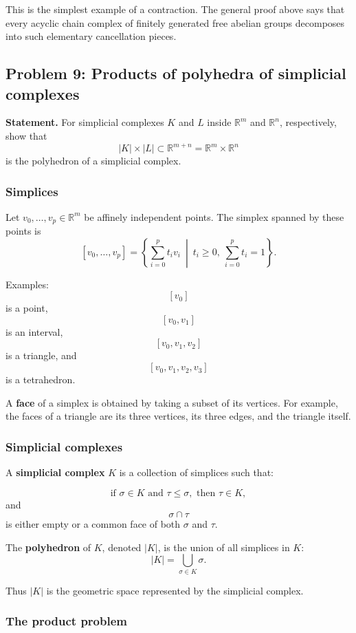 \documentclass[12pt,a4paper]{article}
\theoremstyle{notespace}
\begin{document}
This is the simplest example of a contraction. The general proof above says that every acyclic chain complex of finitely generated free abelian groups decomposes into such elementary cancellation pieces.

\subsection{Problem 9: Products of polyhedra of simplicial complexes}

\textbf{Statement.}
For simplicial complexes \(K\) and \(L\) inside \(\mathbb R^m\) and \(\mathbb R^n\), respectively, show that
\[
|K|\times |L|\subset \mathbb R^{m+n}
=
\mathbb R^m\times \mathbb R^n
\]
is the polyhedron of a simplicial complex.

\subsubsection{Simplices}

Let \(v_0,\dots,v_p\in \mathbb R^m\) be affinely independent points. The simplex spanned by these points is
\[
[v_0,\dots,v_p]
=
\left\{
\sum_{i=0}^p t_i v_i
\ \middle|\
t_i\geq 0,\ \sum_{i=0}^p t_i=1
\right\}.
\]

Examples:
\[
[v_0]
\]
is a point,
\[
[v_0,v_1]
\]
is an interval,
\[
[v_0,v_1,v_2]
\]
is a triangle, and
\[
[v_0,v_1,v_2,v_3]
\]
is a tetrahedron.

A \textbf{face} of a simplex is obtained by taking a subset of its vertices. For example, the faces of a triangle are its three vertices, its three edges, and the triangle itself.

\subsubsection{Simplicial complexes}

A \textbf{simplicial complex} \(K\) is a collection of simplices such that:

\[
\text{if } \sigma\in K \text{ and } \tau \leq \sigma,
\text{ then } \tau\in K,
\]
and
\[
\sigma\cap \tau
\]
is either empty or a common face of both \(\sigma\) and \(\tau\).

The \textbf{polyhedron} of \(K\), denoted \(|K|\), is the union of all simplices in \(K\):
\[
|K|=\bigcup_{\sigma\in K}\sigma.
\]

Thus \(|K|\) is the geometric space represented by the simplicial complex.

\subsubsection{The product problem}
\end{document}

